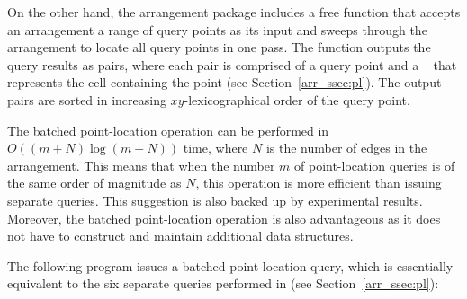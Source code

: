 On the other hand, the arrangement package includes a free
 function that accepts an arrangement a range of
query points as its input and sweeps through the arrangement to
locate all query points in one pass. The function outputs the query
results as pairs, where each pair is comprised of a query point
and a \cgal\  that represents the cell containing the
point (see Section~\ref{arr_ssec:pl}). The output pairs are
sorted in increasing $xy$-lexicographical order of the query point.

The batched point-location operation can be performed in
$O\left((m+N)\log{(m+N)}\right)$ time, where $N$ is the number of
edges in the arrangement. This means that when the number $m$ of
point-location queries is of the same order of magnitude as $N$,
this operation is more efficient than issuing separate queries.
This suggestion is also backed up by experimental results.
Moreover, the batched point-location operation is also
advantageous as it does not have to construct and maintain
additional data structures.

The following program issues a batched point-location query, which
is essentially equivalent to the six separate queries performed in
 (see Section~\ref{arr_ssec:pl}):

